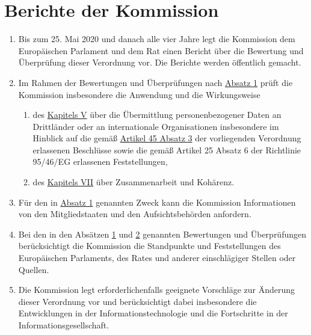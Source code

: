 \chapter{Berichte der Kommission}
\label{ch:97}


\begin{enumerate}

  \item Bis zum 25. Mai 2020 und danach alle vier Jahre legt die Kommission dem Europäischen Parlament und dem Rat einen
   Bericht über die Bewertung und Überprüfung dieser Verordnung vor. Die Berichte werden öffentlich gemacht.
  \label{itm:97-1}

  \item Im Rahmen der Bewertungen und Überprüfungen nach \hyperref[itm:97-1]{Absatz 1} prüft die Kommission insbesondere
   die Anwendung und die Wirkungsweise
  \label{itm:97-2}

  \begin{enumerate}
  
    \item des \hyperref[part:5]{Kapitels V} über die Übermittlung personenbezogener Daten an Drittländer oder an
     internationale Organisationen insbesondere im Hinblick auf die gemäß \hyperref[itm:45-3]{Artikel 45 Absatz 3} der
     vorliegenden Verordnung erlassenen Beschlüsse sowie die gemäß Artikel 25 Absatz 6 der Richtlinie 95/46/EG
     erlassenen Feststellungen,
    \label{itm:97-2a}

    \item des \hyperref[part:7]{Kapitels VII} über Zusammenarbeit und Kohärenz.
    \label{itm:97-2b}

  \end{enumerate}

  \item Für den in \hyperref[itm:97-1]{Absatz 1} genannten Zweck kann die Kommission Informationen von den
   Mitgliedstaaten und den Aufsichtsbehörden anfordern.
  \label{itm:97-3}

  \item Bei den in den Absätzen \hyperref[itm:97-1]{1} und \hyperref[itm:97-2]{2} genannten Bewertungen und
   Überprüfungen berücksichtigt die Kommission die Standpunkte und Feststellungen des Europäischen Parlaments, des
   Rates und anderer einschlägiger Stellen oder Quellen.
  \label{itm:97-4}

  \item Die Kommission legt erforderlichenfalls geeignete Vorschläge zur Änderung dieser Verordnung vor und
   berücksichtigt dabei insbesondere die Entwicklungen in der Informationstechnologie und die Fortschritte in der
   Informationsgesellschaft.
  \label{itm:97-5}

\end{enumerate}


